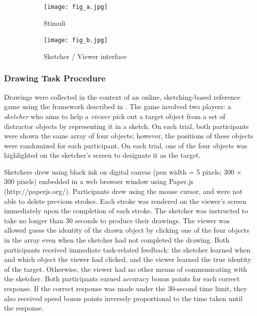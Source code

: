 \documentclass[10pt,letterpaper]{article}
\begin{document}


\begin{figure}
\begin{subfigure}{0.23\textwidth}
\texttt{[image: fig\_a.jpg]}
\caption{Stimuli} \label{fig:1a}
\end{subfigure}
\hspace*{\fill}
\begin{subfigure}{0.23\textwidth}
\texttt{[image: fig\_b.jpg]}
\caption{Sketcher / Viewer interface} \label{fig:1b}
\end{subfigure}
\caption{} \label{fig:1}
\end{figure}

\subsubsection{Drawing Task Procedure}
Drawings were collected in the context of an online, sketching-based reference game using the framework described in . The game involved two players: a \textit{sketcher} who aims to help a \textit{viewer} pick out a target object from a set of distractor objects by representing it in a sketch. On each trial, both participants were shown the same array of four objects; however, the positions of these objects were randomized for each participant. On each trial, one of the four objects was highlighted on the sketcher's screen to designate it as the target.

Sketchers drew using black ink on digital canvas (pen width = 5 pixels; 300 $\times$ 300 pixels) embedded in a web browser window using Paper.js (http://paperjs.org/). Participants drew using the mouse cursor, and were not able to delete previous strokes. Each stroke was rendered on the viewer's screen immediately upon the completion of each stroke. The sketcher was instructed to take no longer than 30 seconds to produce their drawings. The viewer was allowed guess the identity of the drawn object by clicking one of the four objects in the array even when the sketcher had not completed the drawing. Both participants received immediate task-related feedback: the sketcher learned when and which object the viewer had clicked, and the viewer learned the true identity of the target. Otherwise, the viewer had no other means of communicating with the sketcher. Both participants earned accuracy bonus points for each correct response. If the correct response was made under the 30-second time limit, they also received speed bonus points inversely proportional to the time taken until the response.
\end{document}
